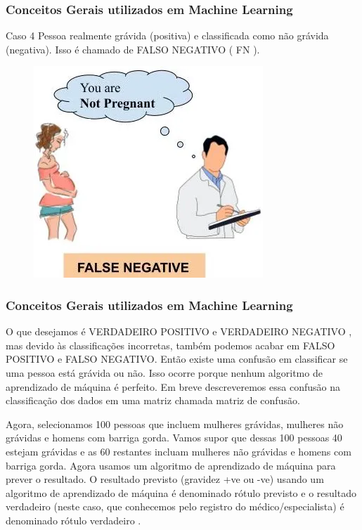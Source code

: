 \documentclass{beamer}
\begin{document}
\begin{frame}
	\frametitle{Conceitos Gerais utilizados em Machine Learning}
	\begin{block}{Caso 4}
		Pessoa realmente grávida (positiva) e classificada como não grávida (negativa). Isso é chamado de FALSO NEGATIVO ( FN ).
	\end{block}
	\begin{figure}
		\centering
		\includegraphics[width=0.4\linewidth]{figures/false_negative}
	\end{figure}
	
\end{frame}
\begin{frame}
	\frametitle{Conceitos Gerais utilizados em Machine Learning}
	O que desejamos é VERDADEIRO POSITIVO e VERDADEIRO NEGATIVO , mas devido às classificações incorretas, também podemos acabar em FALSO POSITIVO e FALSO NEGATIVO. Então existe uma confusão em classificar se uma pessoa está grávida ou não. Isso ocorre porque nenhum algoritmo de aprendizado de máquina é perfeito. Em breve descreveremos essa confusão na classificação dos dados em uma matriz chamada matriz de confusão.
	
	Agora, selecionamos 100 pessoas que incluem mulheres grávidas, mulheres não grávidas e homens com barriga gorda. Vamos supor que dessas 100 pessoas 40 estejam grávidas e as 60 restantes incluam mulheres não grávidas e homens com barriga gorda. Agora usamos um algoritmo de aprendizado de máquina para prever o resultado. O resultado previsto (gravidez +ve ou -ve) usando um algoritmo de aprendizado de máquina é denominado rótulo previsto e o resultado verdadeiro (neste caso, que conhecemos pelo registro do médico/especialista) é denominado rótulo verdadeiro .
	
\end{frame}
\end{document}
